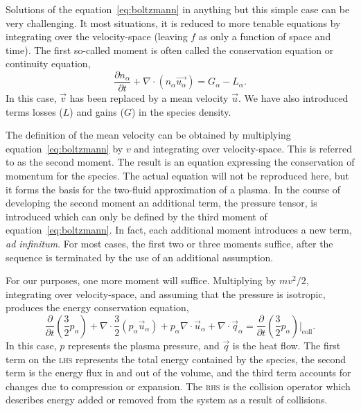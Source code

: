 Solutions of the equation~\ref{eq:boltzmann} in anything but this simple case
can be very challenging. It most situations, it is reduced to more tenable
equations by integrating over the velocity-space (leaving $f$ as only a function
of space and time). The first so-called moment is often called the conservation
equation or continuity equation,
\begin{equation}\label{eq:cont}
  \frac{\partial n_\alpha}{\partial t} + \nabla \cdot (n_\alpha \vec{u_\alpha})
  = G_\alpha - L_\alpha.
\end{equation}
In this case, $\vec{v}$ has been replaced by a mean velocity $\vec{u}$. We have
also introduced terms losses ($L$) and gains ($G$) in the species density.

The definition of the mean velocity can be obtained by multiplying
equation~\ref{eq:boltzmann} by $v$ and integrating over velocity-space. This is
referred to as the second moment. The result is an equation expressing the
conservation of momentum for the species. The actual equation will not be
reproduced here, but it forms the basis for the two-fluid approximation of a
plasma. In the course of developing the second moment an additional term, the
pressure tensor, is introduced which can only be defined by the third moment of
equation~\ref{eq:boltzmann}. In fact, each additional moment introduces a new
term, \emph{ad infinitum}. For most cases, the first two or three moments
suffice, after the sequence is terminated by the use of an additional
assumption.

For our purposes, one more moment will suffice. Multiplying by $mv^2/2$,
integrating over velocity-space, and assuming that the pressure is isotropic,
produces the energy conservation equation,
\begin{equation}
  \frac{\partial}{\partial t}\left(\frac{3}{2}p_\alpha\right) 
  + \nabla\cdot\frac{3}{2} (p_\alpha\vec{u}_\alpha)
  + p_\alpha\nabla\cdot\vec{u}_\alpha
  + \nabla\cdot\vec{q}_\alpha
  = \frac{\partial}{\partial
  t}\left(\frac{3}{2}p_\alpha\right)\bigg|_\mathrm{coll}.
\end{equation}
In this case, $p$ represents the plasma pressure, and $\vec{q}$ is the heat
flow. The first term on the \textsc{lhs} represents the total energy contained
by the species, the second term is the energy flux in and out of the volume, and
the third term accounts for changes due to compression or expansion. The
\textsc{rhs} is the collision operator which describes energy added or removed
from the system as a result of collisions.

